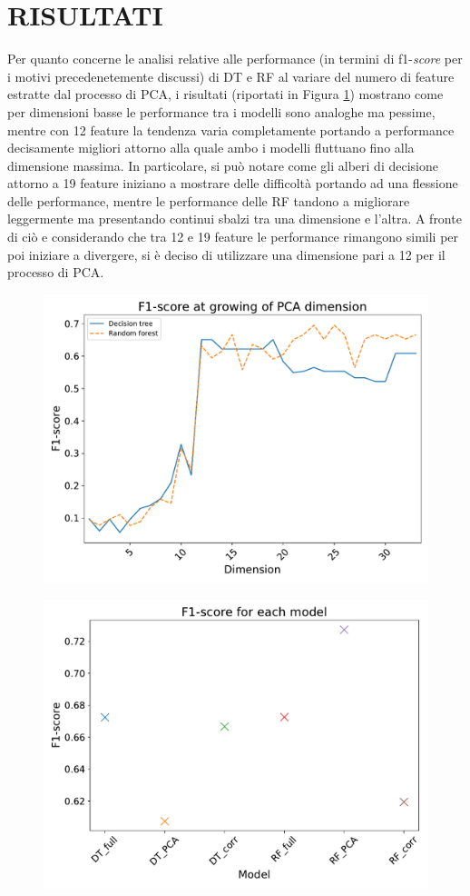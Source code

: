 \section{RISULTATI}
Per quanto concerne le analisi relative alle performance (in termini di f1-\textit{score} per i motivi precedenetemente discussi) di DT e RF al variare del numero di feature estratte dal processo di PCA, i risultati (riportati in Figura \ref{fig:pca-perf}) mostrano come per dimensioni basse le performance tra i modelli sono analoghe ma pessime, mentre con 12 feature la tendenza varia completamente portando a performance decisamente migliori attorno alla quale ambo i modelli fluttuano fino alla dimensione massima.
In particolare, si può notare come gli alberi di decisione attorno a 19 feature iniziano a mostrare delle difficoltà portando ad una flessione delle performance, mentre le performance delle RF tandono a migliorare leggermente ma presentando continui sbalzi tra una dimensione e l'altra.
A fronte di ciò e considerando che tra 12 e 19 feature le performance rimangono simili per poi iniziare a divergere, si è deciso di utilizzare una dimensione pari a 12 per il processo di PCA.
\begin{figure}
	\centering
	\includegraphics[width=0.9\linewidth]{images/pca-perf}
	\caption{}
	\label{fig:pca-perf}
\end{figure}


\begin{figure}
	\centering
	\includegraphics[width=0.8\linewidth]{images/fscore}
	\caption{}
	\label{fig:fscore}
\end{figure}

